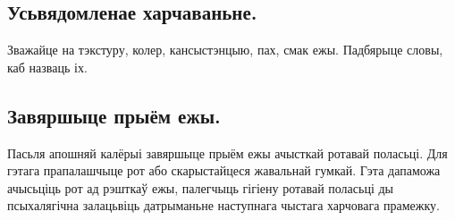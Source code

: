 \subsection{Усьвядомленае харчаваньне.}
Зважайце на тэкстуру, колер, кансыстэнцыю, пах, смак ежы. Падбярыце словы, каб назваць іх.

\subsection{Завяршыце прыём ежы.}
Пасьля апошняй калёрыі завяршыце прыём ежы ачысткай ротавай поласьці. Для гэтага прапалашчыце рот або скарыстайцеся жавальнай гумкай. Гэта дапаможа ачысьціць рот ад рэшткаў ежы, палегчыць гігіену ротавай поласьці ды псыхалягічна залацьвіць датрыманьне наступнага чыстага харчовага прамежку.
